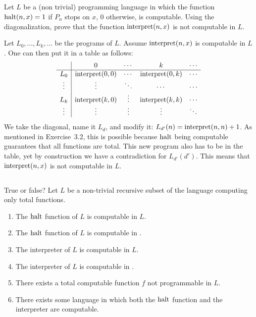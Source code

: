 \subsection{} %
Let \(L\) be a (non trivial) programming language
in which the function \(\mathrm{halt}(n, x) = 1\) if \(P_n\) stops on \(x\),
\(0\) otherwise, is computable.
Using the diagonalization, prove that the function \(\mathrm{interpret}(n, x)\)
is not computable in \(L\).

\begin{solution}
Let \(L_0, \ldots, L_k, \ldots\) be the programs of \(L\).
Assume \(\mathrm{interpret}(n, x)\) is computable in \(L\).
One can then put it in a table as follows:
\[
\begin{array}{c|cccc}
	& 0 & \cdots & k & \cdots \\
	\hline
	L_0 & \mathrm{interpret}(0, 0) & \cdots & \mathrm{interpret}(0, k) & \cdots\\
	\vdots & \vdots & \ddots & \cdots & \cdots\\
	L_k & \mathrm{interpret}(k, 0) & \vdots & \mathrm{interpret}(k, k) & \cdots\\
	\vdots & \vdots & \vdots & \vdots & \ddots
\end{array}
\]
We take the diagonal, name it \(L_d\), and modify it:
\(L_{d'}(n) = \mathrm{interpret}(n, n) + 1\).
As mentioned in Exercise~3.2, this is possible
because \(\mathrm{halt}\) being computable guarantees that all functions are total.
This new program also has to be in the table,
yet by construction we have a contradiction for \(L_{d'}(d')\).
This means that \(\mathrm{interpret}(n, x)\) is not computable in \(L\).
\end{solution}

\subsection{} %
True or false?
Let \(L\) be a non-trivial recursive subset of the \java{} language
computing only total functions.
\begin{enumerate}
	\item The \(\mathrm{halt}\) function of \(L\) is computable in \(L\).
	\item The \(\mathrm{halt}\) function of \(L\) is computable in \java.
	\item The interpreter of \(L\) is computable in \(L\).
	\item The interpreter of \(L\) is computable in \java.
	\item There exists a total computable function \(f\)
	not programmable in \(L\).
	\item There exists some language in which both the \(\mathrm{halt}\) function
	and the interpreter are computable.
\end{enumerate}

